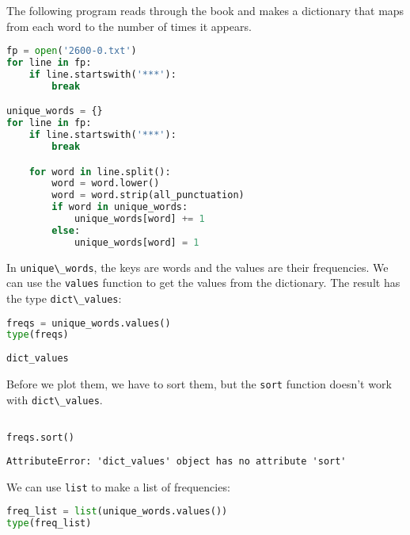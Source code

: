 The following program reads through the book and makes a dictionary that
maps from each word to the number of times it appears.

\begin{lstlisting}[language=Python,style=source]
fp = open('2600-0.txt')
for line in fp:
    if line.startswith('***'):
        break

unique_words = {}
for line in fp:
    if line.startswith('***'):
        break

    for word in line.split():
        word = word.lower()
        word = word.strip(all_punctuation)
        if word in unique_words:
            unique_words[word] += 1
        else:
            unique_words[word] = 1
\end{lstlisting}

In \passthrough{\lstinline!unique\_words!}, the keys are words and the
values are their frequencies. We can use the
\passthrough{\lstinline!values!} function to get the values from the
dictionary. The result has the type
\passthrough{\lstinline!dict\_values!}:

\begin{lstlisting}[language=Python,style=source]
freqs = unique_words.values()
type(freqs)
\end{lstlisting}

\begin{lstlisting}[style=output]
dict_values
\end{lstlisting}

\pagebreak

Before we plot them, we have to sort them, but the
\passthrough{\lstinline!sort!} function doesn't work with
\passthrough{\lstinline!dict\_values!}.

\begin{lstlisting}[language=Python,style=source]
%%expect AttributeError

freqs.sort()
\end{lstlisting}

\begin{lstlisting}[style=output]
AttributeError: 'dict_values' object has no attribute 'sort'
\end{lstlisting}

We can use \passthrough{\lstinline!list!} to make a list of frequencies:

\begin{lstlisting}[language=Python,style=source]
freq_list = list(unique_words.values())
type(freq_list)
\end{lstlisting}

